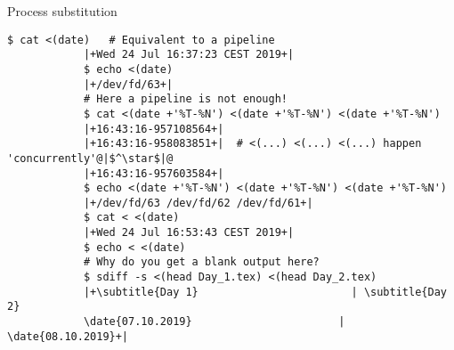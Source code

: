 \begin{frame}[fragile]{Process substitution}
\begin{onlyenv}
\begin{lstlisting}[style=MyBash, xleftmargin=2mm, xrightmargin=0mm]
            $ cat <(date)   # Equivalent to a pipeline
            |+Wed 24 Jul 16:37:23 CEST 2019+|
            $ echo <(date)
            |+/dev/fd/63+|
            # Here a pipeline is not enough!
            $ cat <(date +'%T-%N') <(date +'%T-%N') <(date +'%T-%N')
            |+16:43:16-957108564+|
            |+16:43:16-958083851+|  # <(...) <(...) <(...) happen 'concurrently'@|$^\star$|@
            |+16:43:16-957603584+|
            $ echo <(date +'%T-%N') <(date +'%T-%N') <(date +'%T-%N')
            |+/dev/fd/63 /dev/fd/62 /dev/fd/61+|
            $ cat < <(date)
            |+Wed 24 Jul 16:53:43 CEST 2019+|
            $ echo < <(date)
            # Why do you get a blank output here?
            $ sdiff -s <(head Day_1.tex) <(head Day_2.tex)
            |+\subtitle{Day 1}                        | \subtitle{Day 2}
            \date{07.10.2019}                       | \date{08.10.2019}+|
        \end{lstlisting}
    \end{onlyenv}
\end{frame}
